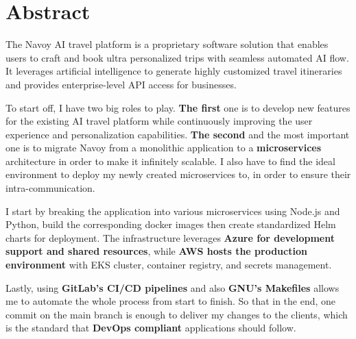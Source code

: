 \section*{Abstract}
The Navoy AI travel platform is a proprietary software solution that enables users to craft and book ultra personalized trips with seamless automated AI flow.
It leverages artificial intelligence to generate highly customized travel itineraries and provides enterprise-level API access for businesses.

To start off, I have two big roles to play.
\textbf{The first} one is to develop new features for the existing AI travel platform while continuously improving the user experience and personalization capabilities.
\textbf{The second} and the most important one is to migrate Navoy from a monolithic application to a \textbf{microservices} architecture in order to make it infinitely scalable. I also have to find the ideal environment to deploy my newly created microservices to, in order to ensure their intra-communication.

I start by breaking the application into various microservices using Node.js and Python, build the corresponding docker images then create standardized Helm charts for deployment. The infrastructure leverages \textbf{Azure for development support and shared resources}, while \textbf{AWS hosts the production environment} with EKS cluster, container registry, and secrets management.

Lastly, using \textbf{GitLab's CI/CD pipelines} and also \textbf{GNU's Makefiles} allows me to automate the whole process from start to finish.
So that in the end, one commit on the main branch is enough to deliver my changes to the clients, which is the standard that \textbf{DevOps compliant} applications should follow.

\newpage
